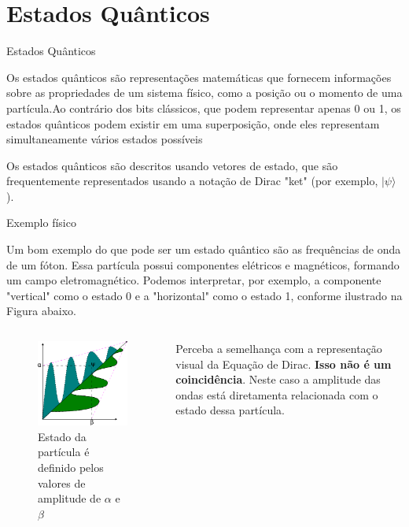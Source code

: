 	\section{Estados Quânticos}

	\begin{frame}{Estados Quânticos}
		\par Os estados quânticos são representações matemáticas que fornecem informações sobre as propriedades de um sistema físico, como a posição ou o momento de uma partícula.Ao contrário dos bits clássicos, que podem representar apenas 0 ou 1, os estados quânticos podem existir em uma superposição, onde eles representam simultaneamente vários estados possíveis\newline
		
		\par Os estados quânticos são descritos usando vetores de estado, que são frequentemente representados usando a notação de Dirac "ket" (por exemplo, $|\psi\rangle$).
	\end{frame}

	\begin{frame}{Exemplo físico}
		\par Um bom exemplo do que pode ser um estado quântico são as frequências de onda de um fóton. Essa partícula possui componentes elétricos e magnéticos, formando um campo eletromagnético. Podemos interpretar, por exemplo, a componente "vertical" como o estado 0 e a "horizontal" como o estado 1, conforme ilustrado na Figura abaixo.
		
		\begin{columns}
			\begin{column}{0.5\textwidth}
				\begin{figure}[H]
					\centering
					\includegraphics[width=0.6\linewidth]{../text/images/photonState01}
					\caption{Estado da partícula é definido pelos valores de amplitude de $\alpha$ e $\beta$ }
					\label{fig:photonstate01}
				\end{figure}
			\end{column}
			\begin{column}{0.5\textwidth}
				\par Perceba a semelhança com a representação visual da Equação de Dirac. \textbf{Isso não é um coincidência}. Neste caso a amplitude das ondas está diretamenta relacionada com o estado dessa partícula.
			\end{column}
		\end{columns}
		
	\end{frame}

